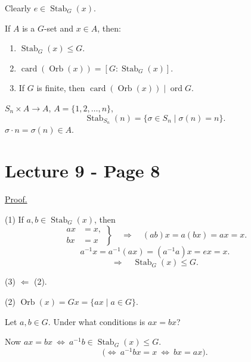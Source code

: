 \noindent Clearly $e\in\operatorname{Stab}_G(x)$.

\bigskip
\noindent{} If $A$ is a $G$-set and $x\in A$, then:
\begin{enumerate}
\item[(1)] $\operatorname{Stab}_G(x)\leq G$.
\item[(2)] $\operatorname{card}(\operatorname{Orb}(x))
=[G:\operatorname{Stab}_G(x)]$.
\item[(3)] If $G$ is finite, then
$\operatorname{card}(\operatorname{Orb}(x))\mid\operatorname{ord}G$.
\end{enumerate}

\bigskip
\noindent $S_n\times A\longrightarrow A$, \qquad $A=\{1,2,\ldots,n\}$,
\[
\operatorname{Stab}_{S_n}(n)
=\{\sigma\in S_n\mid\sigma(n)=n\}.
\]
\noindent $\sigma\cdot n=\sigma(n)\in A$.



\bigskip
\bigskip

\section*{Lecture 9 - Page 8}

\noindent\underline{Proof.}

\bigskip
\noindent (1) If $a,b\in\operatorname{Stab}_G(x)$, then
\[
\left.\begin{aligned}
 ax&=x,\\
 bx&=x
\end{aligned}\right\}
\quad\Longrightarrow\quad (ab)x=a(bx)=ax=x.
\]
\[
a^{-1}x=a^{-1}(ax)=(a^{-1}a)x=ex=x.
\]
\[
\Longrightarrow\quad \operatorname{Stab}_G(x)\leq G.
\]

\bigskip
\noindent (3) $\Longleftarrow$ (2).

\bigskip
\noindent (2) $\operatorname{Orb}(x)=Gx=\{ax\mid a\in G\}$.

\bigskip
\noindent Let $a,b\in G$. Under what conditions is $ax=bx$?

\bigskip
\noindent Now $ax=bx\ \Longleftrightarrow\ a^{-1}b\in\operatorname{Stab}_G(x)\leq G$.
\[
\big(\Longleftrightarrow\ a^{-1}bx=x\ \Longleftrightarrow\ bx=ax\big).
\]
